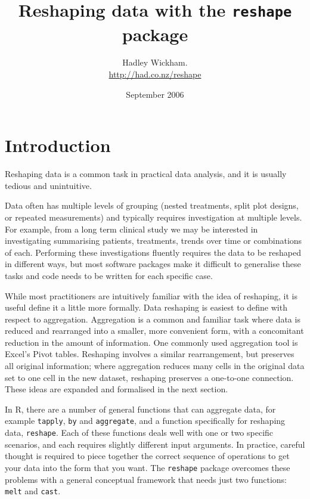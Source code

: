 \documentclass[oneside,letterpaper]{scrartcl}
\title{Reshaping data with the {\tt reshape} package}
\author{Hadley Wickham. \\
\url{http://had.co.nz/reshape}}
\date{September 2006}
\begin{document}
\maketitle
\setcounter{tocdepth}{2}
\tableofcontents
\newpage

\section{Introduction}


Reshaping data is a common task in practical data analysis, and it is usually tedious and unintuitive.  

Data often has multiple levels of grouping (nested treatments, split plot designs, or repeated measurements) and typically requires investigation at multiple levels. For example, from a long term clinical study we may be interested in investigating summarising patients, treatments, trends over time or combinations of each. Performing these investigations fluently requires the data to be reshaped in different ways, but most software packages make it difficult to generalise these tasks and code needs to be written for each specific case. 

While most practitioners are intuitively familiar with the idea of reshaping, it is useful define it a little more formally.  Data reshaping is easiest to define with respect to aggregation.  Aggregation is a common and familiar task where data is reduced and rearranged into a smaller, more convenient form, with a concomitant reduction in the amount of information.  One commonly used aggregation tool is Excel's Pivot tables.  Reshaping involves a similar rearrangement, but preserves all original information; where aggregation reduces many cells in the original data set to one cell in the new dataset, reshaping preserves a one-to-one connection.   These ideas are expanded and formalised in the next section. 

In R, there are a number of general functions that can aggregate data, for example {\tt tapply}, {\tt by} and {\tt aggregate}, and a function specifically for reshaping data, {\tt reshape}.  Each of these functions deals well with one or two specific scenarios, and each requires slightly different input arguments.  In practice, careful thought is required to piece together the correct sequence of operations to get your data into the form that you want.  The {\tt reshape} package overcomes these problems with a general conceptual framework that needs just two functions: {\tt melt} and {\tt cast}.
\end{document}
